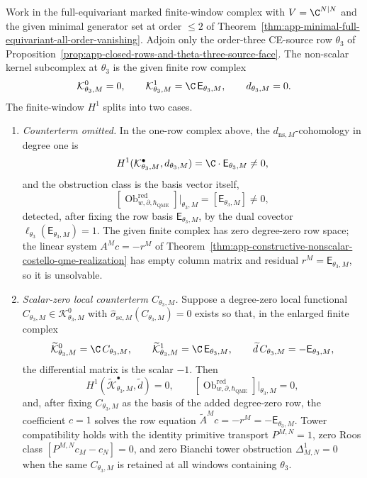 \begin{thm}
\label{thm:app-theta-three-finite-window-H1}
  Work in the full-equivariant marked finite-window complex with
  \(V=\C^{N|N}\) and the given minimal generator set at order \(\le2\)
  of Theorem~\ref{thm:app-minimal-full-equivariant-all-order-vanishing}.
  Adjoin only the order-three CE-source row \(\theta_3\) of
  Proposition~\ref{prop:app-closed-rows-and-theta-three-source-face}.
  The non-scalar kernel subcomplex at \(\theta_3\) is the given
  finite row complex
  \[
    \mathcal K^0_{\theta_3,M}=0,\qquad
    \mathcal K^1_{\theta_3,M}=\C\,\mathsf E_{\theta_3,M},\qquad
    d_{\theta_3,M}=0.
  \]
  The finite-window \(H^1\) splits into two cases.
  \begin{enumerate}[label=(\alph*)]
    \item \emph{Counterterm omitted.}  In the
      one-row complex above, the \(d_{\mathrm{ns},M}\)-cohomology in
      degree one is
      \[
        H^1(\mathcal K^\bullet_{\theta_3,M},d_{\theta_3,M})
          =\C\cdot\mathsf E_{\theta_3,M}\neq0,
      \]
      and the obstruction class is the basis vector itself,
      \[
        [\operatorname{Ob}^{\mathrm{red}}_{w,\partial,\hbar_{\mathrm{QME}}}]
          \big|_{\theta_3,M}
          =[\mathsf E_{\theta_3,M}]\neq0,
      \]
      detected, after fixing the row basis
      \(\mathsf E_{\theta_3,M}\), by the dual covector
      \(\ell_{\theta_3}(\mathsf E_{\theta_3,M})=1\).
      The given finite complex has zero degree-zero row space; the linear system
      \(A^M c=-r^M\) of
      Theorem~\ref{thm:app-constructive-nonscalar-costello-qme-realization}
      has empty column matrix and residual
      \(r^M=\mathsf E_{\theta_3,M}\), so it is unsolvable.
    \item \emph{Scalar-zero local counterterm \(C_{\theta_3,M}\).}
      Suppose a degree-zero local functional
      \(C_{\theta_3,M}\in\mathcal K^0_{\theta_3,M}\) with
      \(\widehat\sigma_{\mathrm{sc},M}(C_{\theta_3,M})=0\) exists
      so that, in the enlarged finite complex
      \[
        \widetilde{\mathcal K}^0_{\theta_3,M}
          =\C\,C_{\theta_3,M},\qquad
        \widetilde{\mathcal K}^1_{\theta_3,M}
          =\C\,\mathsf E_{\theta_3,M},\qquad
        \widetilde d\,C_{\theta_3,M}=-\mathsf E_{\theta_3,M},
      \]
      the differential matrix is the scalar \(-1\).  Then
      \[
        H^1(\widetilde{\mathcal K}^\bullet_{\theta_3,M},\widetilde d)
          =0,\qquad
        [\operatorname{Ob}^{\mathrm{red}}_{w,\partial,\hbar_{\mathrm{QME}}}]
          \big|_{\theta_3,M}=0,
      \]
      and, after fixing \(C_{\theta_3,M}\) as the basis of the added
      degree-zero row, the coefficient \(c=1\)
      solves the row equation \(\widetilde A^M c=-r^M=
      -\mathsf E_{\theta_3,M}\).  Tower compatibility holds with the
      identity primitive transport
      \(P^{M,N}=1\), zero Roos class
      \([P^{M,N}c_M-c_N]=0\), and zero Bianchi tower obstruction
      \(\Delta^1_{M,N}=0\) when the same \(C_{\theta_3,M}\) is
      retained at all windows containing \(\theta_3\).
  \end{enumerate}


\end{thm}
